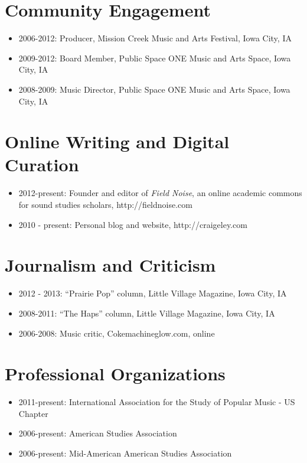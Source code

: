\documentclass[11pt, a4paper]{article}
\begin{document}
\section{Community Engagement}

\begin{itemize}
\itemsep1pt\parskip0pt
\item
  2006-2012: Producer, Mission Creek Music and Arts Festival, Iowa City,
  IA
\item
  2009-2012: Board Member, Public Space ONE Music and Arts Space, Iowa
  City, IA
\item
  2008-2009: Music Director, Public Space ONE Music and Arts Space, Iowa
  City, IA
\end{itemize}

\section{Online Writing and Digital Curation}

\begin{itemize}
\itemsep1pt\parskip0pt
\item
  2012-present: Founder and editor of \emph{Field Noise}, an online
  academic commons for sound studies scholars, http://fieldnoise.com
\item
  2010 - present: Personal blog and website, http://craigeley.com
\end{itemize}

\section{Journalism and Criticism}

\begin{itemize}
\itemsep1pt\parskip0pt
\item
  2012 - 2013: ``Prairie Pop'' column, Little Village Magazine, Iowa
  City, IA
\item
  2008-2011: ``The Haps'' column, Little Village Magazine, Iowa City, IA
\item
  2006-2008: Music critic, Cokemachineglow.com, online
\end{itemize}

\section{Professional Organizations}

\begin{itemize}
\itemsep1pt\parskip0pt
\item
  2011-present: International Association for the Study of Popular Music
  - US Chapter
\item
  2006-present: American Studies Association
\item
  2006-present: Mid-American American Studies Association
\end{itemize}
\end{document}
